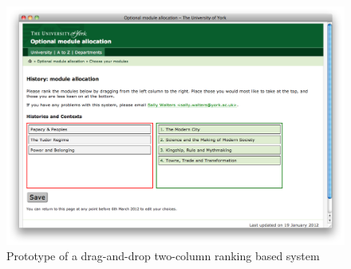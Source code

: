 \documentclass[]{scrartcl}
\begin{document}
\begin{figure}
  \begin{center}
    \includegraphics[width=0.85\linewidth]{images/prototypes/student_prototype_3.png}
  \end{center}
  \caption{Prototype of a drag-and-drop two-column ranking based system}
  \label{prototype_student_2col}
\end{figure}

\clearpage
\printglossaries

\clearpage

\end{document}
